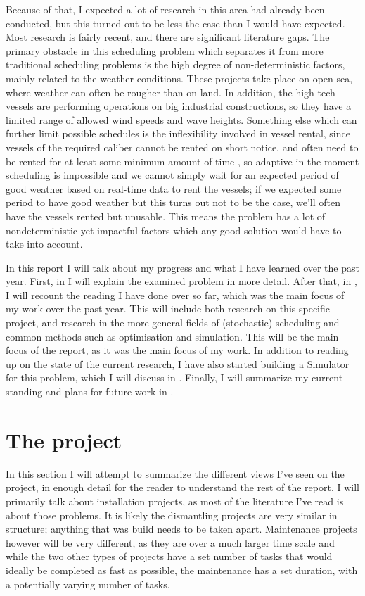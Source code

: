 \documentclass[a4paper,12pt]{article}
\begin{document}
Because of that, I expected a lot of research in this area had already been conducted, but this turned out to be less the case than I would have expected. Most research is fairly recent, and there are significant literature gaps. The primary obstacle in this scheduling problem which separates it from more traditional scheduling problems is the high degree of non-deterministic factors, mainly related to the weather conditions. These projects take place on open sea, where weather can often be rougher than on land. In addition, the high-tech vessels are performing operations on big industrial constructions, so they have a limited range of allowed wind speeds and wave heights. Something else which can further limit possible schedules is the inflexibility involved in vessel rental, since vessels of the required caliber cannot be rented on short notice, and often need to be rented for at least some minimum amount of time \cite{kerkhove2017optimised}, so adaptive in-the-moment scheduling is impossible and we cannot simply wait for an expected period of good weather based on real-time data to rent the vessels; if we expected some period to have good weather but this turns out not to be the case, we'll often have the vessels rented but unusable. This means the problem has a lot of nondeterministic yet impactful factors which any good solution would have to take into account. 

In this report I will talk about my progress and what I have learned over the past year. First, in  I will explain the examined problem in more detail. After that, in , I will recount the reading I have done over so far, which was the main focus of my work over the past year. This will include both research on this specific project, and research in the more general fields of (stochastic) scheduling and common methods such as optimisation and simulation. This will be the main focus of the report, as it was the main focus of my work. In addition to reading up on the state of the current research, I have also started building a Simulator for this problem, which I will discuss in . Finally, I will summarize my current standing and plans for future work in . 

\pagebreak

\section{The project} \label{s:project}
In this section I will attempt to summarize the different views I've seen on the project, in enough detail for the reader to understand the rest of the report. I will primarily talk about installation projects, as most of the literature I've read is about those problems. It is likely the dismantling projects are very similar in structure; anything that was build needs to be taken apart. Maintenance projects however will be very different, as they are over a much larger time scale and while the two other types of projects have a set number of tasks that would ideally be completed as fast as possible, the maintenance has a set duration, with a potentially varying number of tasks.
\end{document}
